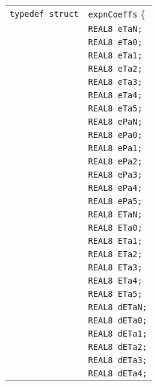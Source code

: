 \documentclass[12pt]{article}
\begin{document}
\begin{tabular}{ll}
\texttt{typedef struct} & \texttt{expnCoeffs} \{ \\
                        & \texttt{REAL8 eTaN;}  \\
                        & \texttt{REAL8 eTa0;}  \\
                        & \texttt{REAL8 eTa1;}  \\
                        & \texttt{REAL8 eTa2;}  \\
                        & \texttt{REAL8 eTa3;}  \\
                        & \texttt{REAL8 eTa4;}  \\
                        & \texttt{REAL8 eTa5;}  \\
                        & \texttt{REAL8 ePaN;}  \\
                        & \texttt{REAL8 ePa0;}  \\
                        & \texttt{REAL8 ePa1;}  \\
                        & \texttt{REAL8 ePa2;}  \\
                        & \texttt{REAL8 ePa3;}  \\
                        & \texttt{REAL8 ePa4;}  \\
                        & \texttt{REAL8 ePa5;}  \\
                        & \texttt{REAL8 ETaN;}  \\
                        & \texttt{REAL8 ETa0;}  \\
                        & \texttt{REAL8 ETa1;}  \\
                        & \texttt{REAL8 ETa2;}  \\
                        & \texttt{REAL8 ETa3;}  \\
                        & \texttt{REAL8 ETa4;}  \\
                        & \texttt{REAL8 ETa5;}  \\
                        & \texttt{REAL8 dETaN;}  \\
                        & \texttt{REAL8 dETa0;}  \\
                        & \texttt{REAL8 dETa1;}  \\
                        & \texttt{REAL8 dETa2;}  \\
                        & \texttt{REAL8 dETa3;}  \\
                        & \texttt{REAL8 dETa4;}  \\

\end{tabular}
\end{document}
